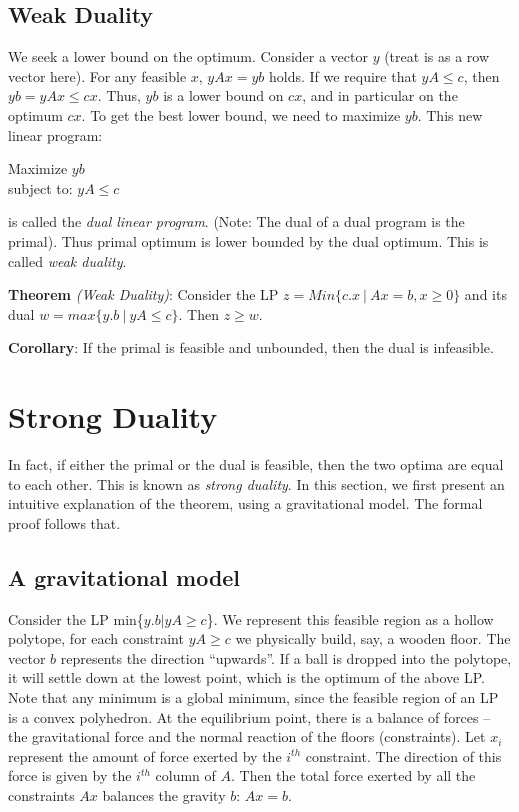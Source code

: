 \documentclass[11pt]{article}
\begin{document}
\subsection{Weak Duality}
We seek a lower bound on the optimum. Consider a vector $y$ (treat is as a row vector here). For any feasible $x$, $yAx=yb$ holds. If we require that $yA\leq c$, then $yb=yAx\leq cx$. Thus, $yb$ is a lower bound on $cx$, and in particular on the optimum $cx$. To get the best lower bound, we need to maximize $yb$. This new linear program:
\begin{center}
Maximize $yb$\\ subject to: $yA\leq c$
\end{center}
is called the \emph{dual linear program}. (Note: The dual of a dual program is the primal). Thus primal optimum is lower bounded by the dual optimum. This is called \emph{weak duality}.

\textbf{Theorem} \emph{(Weak Duality)}:
Consider the LP $z = Min\{c.x\ |\ Ax = b, x \geq 0 \}$ and its dual $w = max \{y.b\ |\ yA \leq c\}$. Then $z \geq w$. 

\textbf{Corollary}:
If the primal is feasible and unbounded, then the dual is infeasible.

\section{Strong Duality}
In fact, if either the primal or the dual is feasible, then the two optima are equal to each other. This is known as \emph{strong duality}. In this section, we first present an intuitive explanation of the theorem, using a gravitational model. The formal proof follows that.

\subsection{A gravitational model}
Consider the LP min\{$y.b|yA\geq c$\}. We represent this feasible region as a hollow polytope, for each constraint $yA \geq c$ we physically build, say, a wooden floor. The vector $b$ represents the direction ``upwards''. If a ball is dropped into the polytope, it will settle down at the lowest point, which is the optimum of the above LP. Note that any minimum is a global minimum, since the feasible region of an LP is a convex polyhedron. At the equilibrium point, there is a balance of forces -- the gravitational force and the normal reaction of the floors (constraints). Let $x_i$ represent the amount of force exerted by the $i^{th}$ constraint. The direction of this force is given by the $i^{th}$ column of $A$. Then the total force exerted by all the constraints $Ax$ balances the gravity $b$: $Ax=b$.
\end{document}
